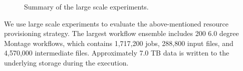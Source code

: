 \begin{figure}[t!]
\centering
\vspace{-10pt}
  \hspace{5pt}
  \hspace{5pt}
\caption{Summary of the large scale experiments.}   
  \label{fig:large_scale_runs} 
\end{figure}

We use large scale experiments to evaluate the above-mentioned resource provisioning strategy. The largest workflow ensemble includes 200 6.0 degree Montage workflows, which contains 1,717,200 jobs, 288,800 input files, and 4,570,000 intermediate files. Approximately 7.0 TB data is written to the underlying storage during the execution. 

